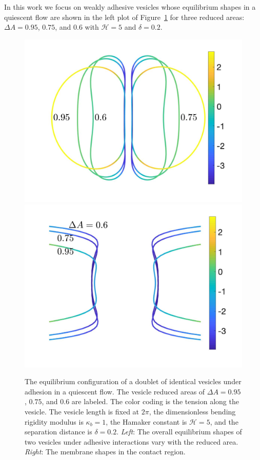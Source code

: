 \documentclass[prf,superscriptaddress,showpacs]{revtex4-1}
\begin{document}
In this work we focus on weakly adhesive vesicles whose equilibrium
shapes in a quiescent flow are shown in the left plot of
Figure~\ref{fig:Dec18_vesicle_shape} for three reduced areas: $\Delta
A=0.95$, $0.75$, and $0.6$ with $\mathcal{H}=5$ and $\delta = 0.2$. 
\begin{figure}
  \includegraphics[keepaspectratio=true,scale=0.175]{figs/Dec18_vesicle_shape_vs_rA_00.jpeg}
  \includegraphics[keepaspectratio=true,scale=0.175]{figs/Dec18_vesicle_shape_vs_rA_01.jpeg}
  \caption{\label{fig:Dec18_vesicle_shape} The equilibrium configuration
  of a doublet of identical vesicles under adhesion in a quiescent flow.
  The vesicle reduced areas of $\Delta A=0.95$, $0.75$, and $0.6$ are
  labeled.  The color coding is the tension along the vesicle.  The
  vesicle length is fixed at $2\pi$, the dimensionless bending rigidity
  modulus is $\kappa_b=1$, the Hamaker constant is $\mathcal{H}=5$, and
  the separation distance is $\delta=0.2$.  {\em Left}: The overall
  equilibrium shapes of two vesicles under adhesive interactions vary
  with the reduced area.  {\em Right}: The membrane shapes in the
  contact region.} 
\end{figure}
\end{document}
